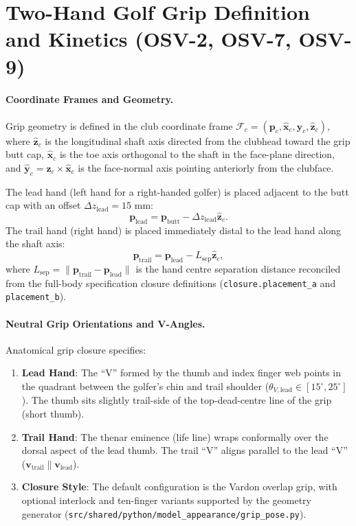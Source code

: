 \documentclass[11pt]{article}
\begin{document}
\section{Two-Hand Golf Grip Definition and Kinetics (OSV-2, OSV-7, OSV-9)}
\label{sec:grip}

\paragraph{Coordinate Frames and Geometry.}
Grip geometry is defined in the club coordinate frame $\mathcal{F}_c = (\mathbf{p}_c, \hat{\mathbf{x}}_c, \hat{\mathbf{y}}_c, \hat{\mathbf{z}}_c)$, where $\hat{\mathbf{z}}_c$ is the longitudinal shaft axis directed from the clubhead toward the grip butt cap, $\hat{\mathbf{x}}_c$ is the toe axis orthogonal to the shaft in the face-plane direction, and $\hat{\mathbf{y}}_c = \hat{\mathbf{z}}_c \times \hat{\mathbf{x}}_c$ is the face-normal axis pointing anteriorly from the clubface.

The lead hand (left hand for a right-handed golfer) is placed adjacent to the butt cap with an offset $\Delta z_{\mathrm{lead}} = 15\text{ mm}$:
\begin{equation}
  \mathbf{p}_{\mathrm{lead}} = \mathbf{p}_{\mathrm{butt}} - \Delta z_{\mathrm{lead}} \hat{\mathbf{z}}_c .
\end{equation}
The trail hand (right hand) is placed immediately distal to the lead hand along the shaft axis:
\begin{equation}
  \mathbf{p}_{\mathrm{trail}} = \mathbf{p}_{\mathrm{lead}} - L_{\mathrm{sep}} \hat{\mathbf{z}}_c ,
\end{equation}
where $L_{\mathrm{sep}} = \|\mathbf{p}_{\mathrm{trail}} - \mathbf{p}_{\mathrm{lead}}\|$ is the hand centre separation distance reconciled from the full-body specification closure definitions (\texttt{closure.placement\_a} and \texttt{placement\_b}).

\paragraph{Neutral Grip Orientations and V-Angles.}
Anatomical grip closure specifies:
\begin{enumerate}
  \item \textbf{Lead Hand}: The ``V'' formed by the thumb and index finger web points in the quadrant between the golfer's chin and trail shoulder ($\theta_{V,\mathrm{lead}} \in [15^\circ, 25^\circ]$). The thumb sits slightly trail-side of the top-dead-centre line of the grip (short thumb).
  \item \textbf{Trail Hand}: The thenar eminence (life line) wraps conformally over the dorsal aspect of the lead thumb. The trail ``V'' aligns parallel to the lead ``V'' ($\mathbf{v}_{\mathrm{trail}} \parallel \mathbf{v}_{\mathrm{lead}}$).
  \item \textbf{Closure Style}: The default configuration is the Vardon overlap grip, with optional interlock and ten-finger variants supported by the geometry generator (\texttt{src/shared/python/model\_appearance/grip\_pose.py}).
\end{enumerate}
\end{document}
